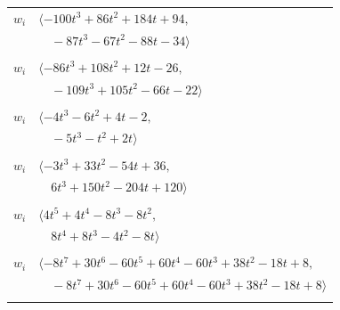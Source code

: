 \documentclass[11pt]{article}
\begin{document}
\begin{longtable}{@{}ll@{}}
$w_i$ & $\langle -100t^{3}+86t^{2}+184t+94,$\\
 & $\quad -87t^{3}-67t^{2}-88t-34\rangle$\\
\addlinespace[2pt]
\multicolumn{2}{@{}p{0.97\textwidth}@{}}{$i=29$, $D_i=8$, $\rho_{ij}$: $1{:}1, \allowbreak 3{:}1, \allowbreak 11{:}2, \allowbreak 12{:}1, \allowbreak 16{:}1, \allowbreak 22{:}2, \allowbreak 24{:}1, \allowbreak 31{:}2, \allowbreak 33{:}1, \allowbreak 34{:}1, \allowbreak 37{:}1$}\\
$w_i$ & $\langle -86t^{3}+108t^{2}+12t-26,$\\
 & $\quad -109t^{3}+105t^{2}-66t-22\rangle$\\
\addlinespace[2pt]
\multicolumn{2}{@{}p{0.97\textwidth}@{}}{$i=30$, $D_i=2$, $\rho_{ij}$: $4{:}1, \allowbreak 8{:}1, \allowbreak 13{:}1, \allowbreak 20{:}1, \allowbreak 28{:}2, \allowbreak 33{:}1, \allowbreak 35{:}2$}\\
$w_i$ & $\langle -4t^{3}-6t^{2}+4t-2,$\\
 & $\quad -5t^{3}-t^{2}+2t\rangle$\\
\addlinespace[2pt]
\multicolumn{2}{@{}p{0.97\textwidth}@{}}{$i=31$, $D_i=4$, $\rho_{ij}$: $6{:}1, \allowbreak 12{:}1, \allowbreak 13{:}1, \allowbreak 25{:}1, \allowbreak 29{:}1, \allowbreak 32{:}2, \allowbreak 33{:}2, \allowbreak 36{:}1, \allowbreak 38{:}2$}\\
$w_i$ & $\langle -3t^{3}+33t^{2}-54t+36,$\\
 & $\quad 6t^{3}+150t^{2}-204t+120\rangle$\\
\addlinespace[2pt]
\multicolumn{2}{@{}p{0.97\textwidth}@{}}{$i=32$, $D_i=4$, $\rho_{ij}$: $20{:}2, \allowbreak 25{:}2, \allowbreak 26{:}1, \allowbreak 31{:}1, \allowbreak 35{:}1, \allowbreak 37{:}2, \allowbreak 38{:}2$}\\
$w_i$ & $\langle 4t^{5}+4t^{4}-8t^{3}-8t^{2},$\\
 & $\quad 8t^{4}+8t^{3}-4t^{2}-8t\rangle$\\
\addlinespace[2pt]
\multicolumn{2}{@{}p{0.97\textwidth}@{}}{$i=33$, $D_i=4$, $\rho_{ij}$: $5{:}2, \allowbreak 16{:}1, \allowbreak 17{:}2, \allowbreak 19{:}2, \allowbreak 21{:}1, \allowbreak 29{:}2, \allowbreak 30{:}2, \allowbreak 31{:}1, \allowbreak 34{:}1, \allowbreak 37{:}1, \allowbreak 39{:}1$}\\
$w_i$ & $\langle -8t^{7}+30t^{6}-60t^{5}+60t^{4}-60t^{3}+38t^{2}-18t+8,$\\
 & $\quad -8t^{7}+30t^{6}-60t^{5}+60t^{4}-60t^{3}+38t^{2}-18t+8\rangle$\\
\addlinespace[2pt]
\multicolumn{2}{@{}p{0.97\textwidth}@{}}{$i=34$, $D_i=16$, $\rho_{ij}$: $15{:}2, \allowbreak 16{:}1, \allowbreak 29{:}2, \allowbreak 33{:}2, \allowbreak 35{:}1, \allowbreak 39{:}2$}\\

\end{longtable}
\end{document}
